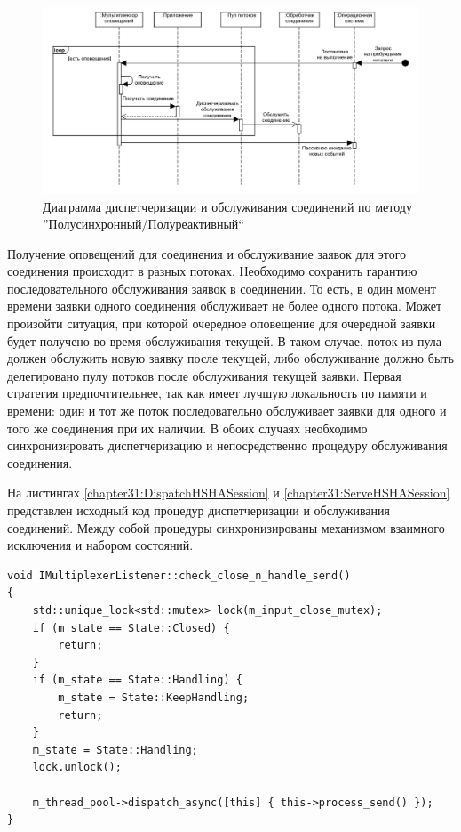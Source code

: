 \begin{figure}[!h]
\caption{Диаграмма диспетчеризации и обслуживания соединений по методу ''Полусинхронный/Полуреактивный``}
\label{chapter31:HSHAMuxSchema}
\includegraphics[width=\textwidth]{../../graphics/schemes/HSHAMuxSequence}
\end{figure}

Получение оповещений для соединения и обслуживание заявок для этого соединения происходит в разных потоках. Необходимо сохранить гарантию последовательного обслуживания заявок в соединении. То есть, в один момент времени заявки одного соединения обслуживает не более одного потока. Может произойти ситуация, при которой очередное оповещение для очередной заявки будет получено во время обслуживания текущей. В таком случае, поток из пула должен обслужить новую заявку после текущей, либо обслуживание должно быть делегировано пулу потоков после обслуживания текущей заявки. Первая стратегия предпочтительнее, так как имеет лучшую локальность по памяти и времени: один и тот же поток последовательно обслуживает заявки для одного и того же соединения при их наличии. В обоих случаях необходимо синхронизировать диспетчеризацию и непосредственно процедуру обслуживания соединения.

На листингах \ref{chapter31:DispatchHSHASession} и \ref{chapter31:ServeHSHASession} представлен исходный код процедур диспетчеризации и обслуживания соединений. Между собой процедуры синхронизированы механизмом взаимного исключения и набором состояний.

\begin{lstlisting}[float=!h,caption={Процедура диспетчеризации обслуживания соединения},label={chapter31:DispatchHSHASession},frame=tlrb]
void IMultiplexerListener::check_close_n_handle_send()
{
    std::unique_lock<std::mutex> lock(m_input_close_mutex);
    if (m_state == State::Closed) {
        return;
    }
    if (m_state == State::Handling) {
        m_state = State::KeepHandling;
        return;
    }
    m_state = State::Handling;
    lock.unlock();

    m_thread_pool->dispatch_async([this] { this->process_send() });
}
\end{lstlisting}

